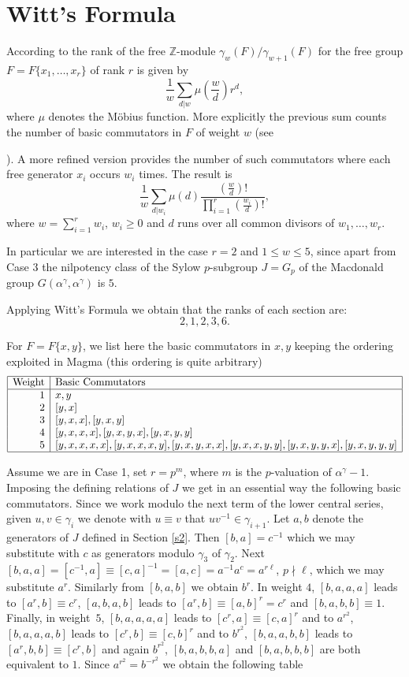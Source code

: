 \documentclass{amsart}
\theoremstyle{definition}
\theoremstyle{remark}
\begin{document}
\section{Witt's Formula}\label{Witt}

According to \cite[Theorem 5.1]{MKS} the rank of the free $\mathbb Z$-module $\gamma_w(F)/\gamma_{w+1}(F)$ for the free
group $F=F\{x_1,\dots,x_r\}$ of rank $r$ is given by 
$$
\frac{1}{w}\sum_{d|w}\mu(\frac{w}{d})r^d,
$$
where $\mu$ denotes the M\"obius function. More explicitly the previous sum counts the number of basic commutators in $F$ of weight $w$ (see {\cite[Ch. 11]{H}).
A more refined version provides the number of such commutators where each free generator $x_i$ occurs $w_i$ times. The result is
$$
\frac{1}{w}\sum_{d|w_i}\mu(d)\frac{(\frac{w}{d})!}{\prod_{i=1}^{r}(\frac{w_i}{d})!},
$$
where $w=\sum_{i=1}^{r}w_i$, $w_i\ge 0$ and $d$ runs over all common divisors of $w_1,\ldots,w_r$.

In particular we are interested in the case $r=2$ and $1\le w\le 5$, since apart from Case $3$ the nilpotency class 
of the Sylow $p$-subgroup $J=G_p$ of the Macdonald group $G(\alpha^\gamma,\alpha^\gamma)$ is $5$.

Applying Witt's Formula we obtain that the ranks of each section are:
$$
2,1,2,3,6.
$$

For $F=F\{x,y\}$, we list here the basic commutators in $x,y$ keeping the ordering exploited in Magma (this ordering is quite arbitrary)
$$
\begin{array}{|r|l|}
  \hline
  \text{Weight}&\text{Basic Commutators}\\
  \hline
  1 & x,y \\
  2 & [y,x] \\
  3 & [y,x,x], [y,x,y] \\
  4 & [y,x,x,x],[y,x,y,x], [y,x,y,y] \\
  5 & [y,x,x,x,x], [y,x,x,x,y],[y,x,y,x,x],[y,x,x,y,y],[y,x,y,y,x], [y,x,y,y,y]\\
  \hline
\end{array}
$$

Assume we are in Case 1, set $r=p^m$, where $m$ is the $p$-valuation of $\alpha^\gamma -1$. Imposing the defining
relations of $J$ we get in an essential way the following basic commutators. Since we work modulo the next term of the lower central series,
given $u,v\in\gamma_i$ we denote with $u\equiv v$ that $uv^{-1}\in\gamma_{i+1}$.
Let $a,b$ denote the generators of $J$ defined in Section \ref{s2}. Then $[b,a]=c^{-1}$ which we may substitute with $c$ as generators modulo $\gamma_3$ of $\gamma_2$.
Next $[b,a,a]=[c^{-1},a]\equiv [c,a]^{-1}=[a,c]=a^{-1}a^c=a^{r\ell}$, $p\nmid \ell$, which we may substitute $a^r$. Similarly from $[b,a,b]$ we obtain $b^r$.
In weight $4$, $[b,a,a,a]$ leads to $[a^r,b]\equiv c^r$, $[a,b,a,b]$ leads to $[a^r,b]\equiv [a,b]^r=c^r$ and $[b,a,b,b]\equiv 1$.
Finally, in weight~$5$, $[b,a,a,a,a]$ leads to $[c^r,a]\equiv [c,a]^r$ and to $a^{r^2}$, $[b,a,a,a,b]$ leads to $[c^r,b]\equiv [c,b]^r$ and to $b^{r^2}$,
$[b,a,a,b,b]$ leads to $[a^r,b,b]\equiv [c^r,b]$ and again $b^{r^2}$, $[b,a,b,b,a]$ and $[b,a,b,b,b]$ are both equivalent to $1$.
Since $a^{r^2}=b^{-r^2}$ we obtain the following table

}
\end{document}
